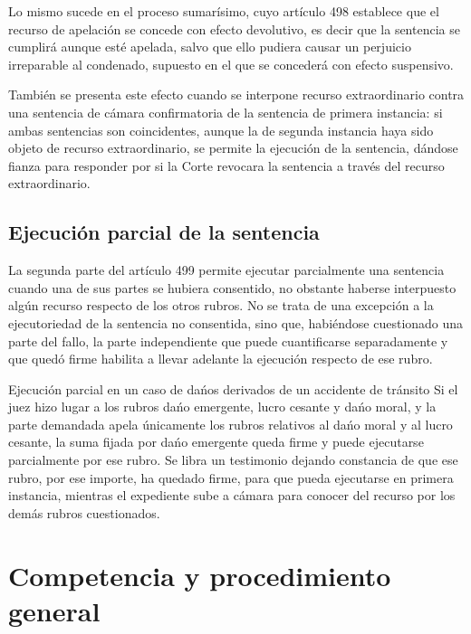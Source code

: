 \documentclass[12pt,oneside]{book}
\begin{document}
Lo mismo sucede en el proceso sumar\'isimo, cuyo art\'iculo 498 establece que el recurso de apelaci\'on se concede con efecto devolutivo, es decir que la sentencia se cumplir\'a aunque est\'e apelada, salvo que ello pudiera causar un perjuicio irreparable al condenado, supuesto en el que se conceder\'a con efecto suspensivo.

Tambi\'en se presenta este efecto cuando se interpone recurso extraordinario contra una sentencia de c\'amara confirmatoria de la sentencia de primera instancia: si ambas sentencias son coincidentes, aunque la de segunda instancia haya sido objeto de recurso extraordinario, se permite la ejecuci\'on de la sentencia, d\'andose fianza para responder por si la Corte revocara la sentencia a trav\'es del recurso extraordinario.

\subsection{Ejecuci\'on parcial de la sentencia}

La segunda parte del art\'iculo 499 permite ejecutar parcialmente una sentencia cuando una de sus partes se hubiera consentido, no obstante haberse interpuesto alg\'un recurso respecto de los otros rubros. No se trata de una excepci\'on a la ejecutoriedad de la sentencia no consentida, sino que, habi\'endose cuestionado una parte del fallo, la parte independiente que puede cuantificarse separadamente y que qued\'o firme habilita a llevar adelante la ejecuci\'on respecto de ese rubro.

\begin{example}{Ejecuci\'on parcial en un caso de da\'nos derivados de un accidente de tr\'ansito}
Si el juez hizo lugar a los rubros da\'no emergente, lucro cesante y da\'no moral, y la parte demandada apela \'unicamente los rubros relativos al da\'no moral y al lucro cesante, la suma fijada por da\'no emergente queda firme y puede ejecutarse parcialmente por ese rubro. Se libra un testimonio dejando constancia de que ese rubro, por ese importe, ha quedado firme, para que pueda ejecutarse en primera instancia, mientras el expediente sube a c\'amara para conocer del recurso por los dem\'as rubros cuestionados.
\end{example}

\section{Competencia y procedimiento general}
\end{document}
